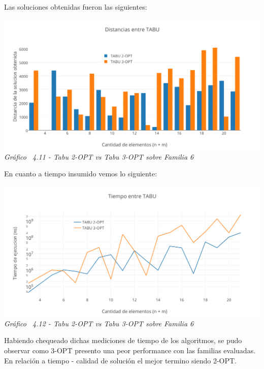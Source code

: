 Las soluciones obtenidas fueron las siguientes:

\vspace*{0.3cm} \vspace*{0.3cm}
  \begin{center}
 \includegraphics[scale=0.5]{./EJ4/comparativorandom.png}\\
 {            \textit{Gráfico \ 4.11 - Tabu 2-OPT vs Tabu 3-OPT sobre Familia 6}}
  \end{center}
  \vspace*{0.3cm}

En cuanto a tiempo insumido vemos lo siguiente:

\vspace*{0.3cm} \vspace*{0.3cm}
  \begin{center}
 \includegraphics[scale=0.5]{./EJ4/medicionrandom.png}\\
 {            \textit{Gráfico \ 4.12 - Tabu 2-OPT vs Tabu 3-OPT sobre Familia 6}}
  \end{center}
  \vspace*{0.3cm}
  

Habiendo chequeado dichas mediciones de tiempo de los algoritmos, se pudo observar como 3-OPT presento una peor performance con las familias evaluadas. En relaci\'on a tiempo - calidad de soluci\'on el mejor termino siendo 2-OPT.

